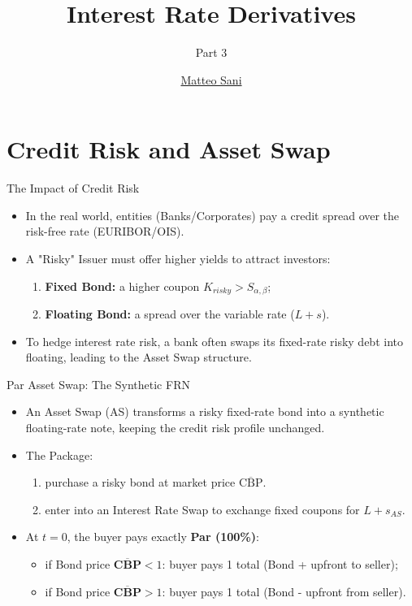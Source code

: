 \documentclass{beamer}
\title{Interest Rate Derivatives}
\subtitle{Part 3}
\author{\href{mailto:matteo.sani@unisi.it}{Matteo Sani}}
\begin{document}
	\begin{frame}[plain]
		\maketitle
	\end{frame}


\section{Credit Risk and Asset Swap}

\begin{frame}{The Impact of Credit Risk}
	\begin{itemize}
		\item In the real world, entities (Banks/Corporates) pay a \textcolor{maincolor}{credit spread} over the risk-free rate (EURIBOR/OIS).
		\item A "Risky" Issuer must offer higher yields to attract investors:
		\begin{enumerate}
			\item \textbf{Fixed Bond:} a higher coupon $K_{risky} > S_{\alpha,\beta}$;
			\item \textbf{Floating Bond:} a spread over the variable rate ($L+s$).
		\end{enumerate}
		\item To hedge interest rate risk, a bank often swaps its fixed-rate risky debt into floating, leading to the Asset Swap structure.
	\end{itemize}
\end{frame}

\begin{frame}{Par Asset Swap: The Synthetic FRN}
	\begin{itemize}
		\item An \textcolor{maincolor}{Asset Swap (AS)} transforms a risky fixed-rate bond into a synthetic floating-rate note, keeping the credit risk profile unchanged.
		\item The Package:
		\begin{enumerate}
			\item purchase a risky bond at market price $\overline{\text{CBP}}$.
			\item enter into an Interest Rate Swap to exchange fixed coupons for $L+s_{AS}$.
		\end{enumerate}
		\item At $t=0$, the buyer pays exactly \textbf{Par (100\%)}:
		\begin{itemize}
			\item if Bond price $\overline{\textbf{CBP}}<1$: buyer pays 1 total (Bond + upfront to seller);
			\item if Bond price $\overline{\textbf{CBP}}>1$: buyer pays 1 total (Bond - upfront from seller).
		\end{itemize}
	\end{itemize}

\end{frame}
\end{document}
